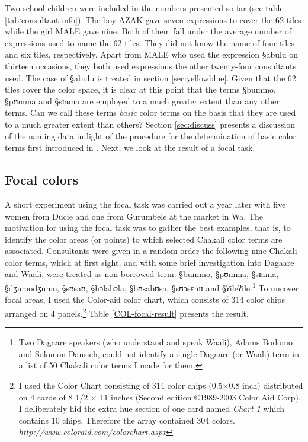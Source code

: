 Two school children
were included in the numbers presented so far (see table
\ref{tabːconsultant-info}). The boy AZAK gave seven
expressions to cover the 62 tiles while the girl MALE gave nine. Both of them
fall under the average number of expressions used to name the 62 tiles. They did
not
know the name of four tiles and six  tiles, respectively. Apart from MALE who
used the
expression {\S abulu} on thirteen occasions, they both used expressions the
other twenty-four consultants used. The case of {\S abulu} is treated in section
\ref{sec:yellowblue}.  Given that the 62 tiles cover the color space, it is
clear at this point that the terms {\S bummo}, {\S pʊmma}
and {\S sɪama} are employed to a much greater extent than any other terms.
 Can we call these terms \textit{basic} color terms on the basis that they are
used
 to a much greater extent than others?  Section \ref{sec:discuss} presents  a
discussion of
the naming data in light of the procedure for the determination of basic color
terms first introduced in \citet[6-7]{Berl69}. Next, we look at the result of a 
focal task.



\subsection{Focal colors}
\label{sec:COL-foci}
 A short experiment using the focal task was carried out a year later with five
women from Ducie and one from Gurumbele at the market in Wa. The motivation for
using the focal task was to gather the best examples, that is, to identify the
color areas (or points) to which selected Chakali color terms are associated.   
 Consultants  were given in a random order  the following nine Chakali color
terms, which at first sight, and with some brief investigation into Dagaare and
Waali, were treated as non-borrowed term: {\S bummo}, {\S pʊmma}, {\S sɪama},
{\S dʒumodʒumo}, {\S sʊsaʊ},  {\S hɔlahɔla},  {\S bʊsabʊsa},  {\S sʊɔsɛnɪɪ} and
{\S ʔileʔile}.\footnote{Two Dagaare speakers (who understand and speak Waali),
Adams Bodomo and Solomon Dansieh, could not identify a single Dagaare (or
Waali) term in  a list of 50 Chakali color terms I made for them.} To uncover
focal areas,
I  used the Color-aid color chart, which consists of 314 color chips arranged
on 4 panels.\footnote{I used the Color Chart consisting of 314 color chips
(0.5$\times$0.8 inch) distributed on 4 cards of 8 1/2 $\times$ 11 inches (Second
edition \copyright 1989-2003 Color Aid Corp). I deliberately hid the extra hue
section of one card named {\it Chart 1} which contains 10 chips. Therefore the
array contained 304 colors. {\it http://www.coloraid.com/colorchart.aspx}} Table
\ref{COL-focal-result} presents the result. 



